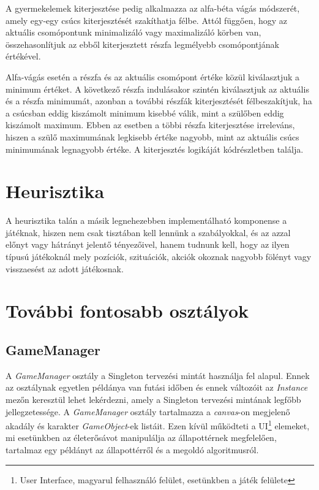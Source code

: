 \documentclass[
]{thesis-ekf}
\theoremstyle{definition}
\theoremstyle{remark}
\begin{document}
A gyermekelemek kiterjesztése pedig alkalmazza az alfa-béta vágás módszerét, amely egy-egy csúcs kiterjesztését szakíthatja félbe. Attól függően, hogy az aktuális csomópontunk minimalizáló vagy maximalizáló körben van, összehasonlítjuk az ebből kiterjesztett részfa legmélyebb csomópontjának értékével. 

Alfa-vágás esetén a részfa és az aktuális csomópont értéke közül kiválasztjuk a minimum értéket. A következő részfa indulásakor szintén kiválasztjuk az aktuális és a részfa minimumát, azonban a további részfák kiterjesztését félbeszakítjuk, ha a csúcsban eddig kiszámolt minimum kisebbé válik, mint a szülőben eddig kiszámolt maximum. Ebben az esetben a többi részfa kiterjesztése irreleváns, hiszen a szülő maximumának legkisebb értéke nagyobb, mint az aktuális csúcs minimumának legnagyobb értéke. \cite{kusper} A kiterjesztés logikáját  kódrészletben találja.




\section{Heurisztika} \label{heuristics}
A heurisztika talán a másik legnehezebben implementálható komponense a játéknak, hiszen nem csak tisztában kell lennünk a szabályokkal, és az azzal előnyt vagy hátrányt jelentő tényezőivel, hanem tudnunk kell, hogy az ilyen típusú játékoknál mely pozíciók, szituációk, akciók okoznak nagyobb fölényt vagy visszaesést az adott játékosnak. 

\section{További fontosabb osztályok} 

\subsection{GameManager} \label{gamemanager}

A \emph{GameManager} osztály a Singleton tervezési mintát használja fel alapul. Ennek az osztálynak egyetlen példánya van futási időben és ennek változóit az \emph{Instance} mezőn keresztül lehet lekérdezni, amely a Singleton tervezési mintának legfőbb jellegzetessége. A \emph{GameManager} osztály tartalmazza a \emph{canvas}-on megjelenő akadály és karakter \emph{GameObject}-ek listáit. Ezen kívül működteti a UI\footnote{User Interface, magyarul felhasználó felület, esetünkben a játék felülete} elemeket, mi esetünkben az életerősávot manipulálja az állapottérnek megfelelően, tartalmaz egy példányt az állapottérről és a megoldó algoritmusról.
\end{document}
